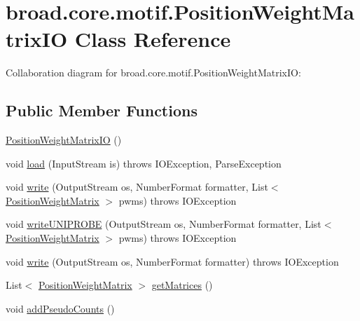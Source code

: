 \hypertarget{classbroad_1_1core_1_1motif_1_1_position_weight_matrix_i_o}{\section{broad.\+core.\+motif.\+Position\+Weight\+Matrix\+I\+O Class Reference}
\label{classbroad_1_1core_1_1motif_1_1_position_weight_matrix_i_o}
}


Collaboration diagram for broad.\+core.\+motif.\+Position\+Weight\+Matrix\+I\+O\+:
\subsection*{Public Member Functions}
\begin{DoxyCompactItemize}
\item 
\hyperlink{classbroad_1_1core_1_1motif_1_1_position_weight_matrix_i_o_ae8e7a7d951e833b389cc6f26f942881e}{Position\+Weight\+Matrix\+I\+O} ()
\item 
void \hyperlink{classbroad_1_1core_1_1motif_1_1_position_weight_matrix_i_o_a4d4b331665324f5ca07ef9e360db589f}{load} (Input\+Stream is)  throws I\+O\+Exception, Parse\+Exception 
\item 
void \hyperlink{classbroad_1_1core_1_1motif_1_1_position_weight_matrix_i_o_ae7003858a23fe9b790f02f3d509fb038}{write} (Output\+Stream os, Number\+Format formatter, List$<$ \hyperlink{classbroad_1_1core_1_1motif_1_1_position_weight_matrix}{Position\+Weight\+Matrix} $>$ pwms)  throws I\+O\+Exception
\item 
void \hyperlink{classbroad_1_1core_1_1motif_1_1_position_weight_matrix_i_o_a3977b5cccf4af47894bdf414e462eda9}{write\+U\+N\+I\+P\+R\+O\+B\+E} (Output\+Stream os, Number\+Format formatter, List$<$ \hyperlink{classbroad_1_1core_1_1motif_1_1_position_weight_matrix}{Position\+Weight\+Matrix} $>$ pwms)  throws I\+O\+Exception
\item 
void \hyperlink{classbroad_1_1core_1_1motif_1_1_position_weight_matrix_i_o_a4be3c5eef538a75072b91930cc861477}{write} (Output\+Stream os, Number\+Format formatter)  throws I\+O\+Exception
\item 
List$<$ \hyperlink{classbroad_1_1core_1_1motif_1_1_position_weight_matrix}{Position\+Weight\+Matrix} $>$ \hyperlink{classbroad_1_1core_1_1motif_1_1_position_weight_matrix_i_o_a0e1024aa1dbbef0403babbfba71cf449}{get\+Matrices} ()
\item 
void \hyperlink{classbroad_1_1core_1_1motif_1_1_position_weight_matrix_i_o_ac4a9e59764703527dff132e17dd50cb8}{add\+Pseudo\+Counts} ()
\end{DoxyCompactItemize}
